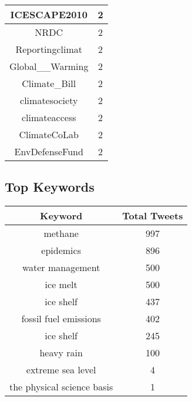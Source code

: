\documentclass{article}\usepackage[T1]{fontenc}
\begin{document}
\begin{tabular}{|c|c|}
ICESCAPE2010 & 2\\ 
 \hline
NRDC & 2\\ 
 \hline
Reportingclimat & 2\\ 
 \hline
Global\_\_Warming & 2\\ 
 \hline
Climate\_Bill & 2\\ 
 \hline
climatesociety & 2\\ 
 \hline
climateaccess & 2\\ 
 \hline
ClimateCoLab & 2\\ 
 \hline
EnvDefenseFund & 2\\ 
 \hline
\end{tabular}\subsection*{Top Keywords}\begin{tabular}{|c|c|}         \hline         Keyword & Total Tweets \\ 
 \hline
methane & 997\\ 
 \hline
epidemics & 896\\ 
 \hline
water management & 500\\ 
 \hline
ice melt & 500\\ 
 \hline
ice shelf & 437\\ 
 \hline
fossil fuel emissions & 402\\ 
 \hline
ice shelf & 245\\ 
 \hline
heavy rain & 100\\ 
 \hline
extreme sea level & 4\\ 
 \hline
the physical science basis & 1\\ 
 \hline
\end{tabular}
\end{document}

